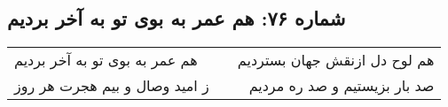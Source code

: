\begin{center}
\section*{شماره ۷۶: هم عمر به بوی تو به آخر بردیم}
\label{sec:076}
\begin{longtable}{l p{0.5cm} r}
هم عمر به بوی تو به آخر بردیم
&&
هم لوح دل ازنقش جهان بستردیم
\\
ز امید وصال و بیم هجرت هر روز
&&
صد بار بزیستیم و صد ره مردیم
\\
\end{longtable}
\end{center}
